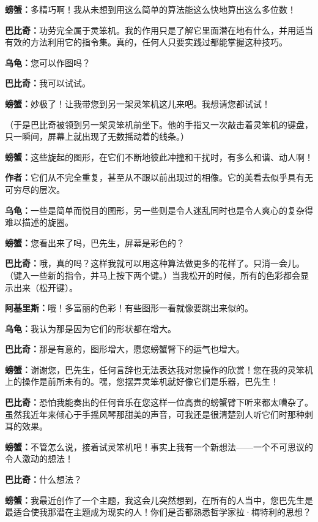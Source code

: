 \documentclass[
  12pt,
  twoside,
  openright,
  oldfontcommands,
]{memoir}
\newcommand{\kaitismall}[1]{{\kaitifamily\small #1}}
\newcommand{\dialogname}[1]{{\heifamily\bfseries #1}}
\begin{document}
\dialogname{螃蟹：}多精巧啊！我从未想到用这么简单的算法能这么快地算出这么多位数！

\dialogname{巴比奇：}功劳完全属于灵笨机。我的作用只是了解它里面潜在地有什么，并用适当有效的方法利用它的指令集。真的，任何人只要实践过都能掌握这种技巧。

\dialogname{乌龟：}您可以作图吗？

\dialogname{巴比奇：}我可以试试。

\dialogname{螃蟹：}妙极了！让我带您到另一架灵笨机这儿来吧。我想请您都试试！

（于是巴比奇被领到另一架灵笨机前坐下。他的手指又一次敲击着灵笨机的键盘，只一瞬间，屏幕上就出现了无数摇动着的线条。）

\dialogname{螃蟹：}这些旋起的图形，在它们不断地彼此冲撞和干扰时，有多么和谐、动人啊！

\dialogname{作者：}它们从不完全重复，甚至从不跟以前出现过的相像。它的美看去似乎具有无可穷尽的层次。

\dialogname{乌龟：}一些是简单而悦目的图形，另一些则是令人迷乱同时也是令人爽心的复杂得难以描述的旋圈。

\dialogname{螃蟹：}您看出来了吗，巴先生，屏幕是彩色的？

\dialogname{巴比奇：}哦，真的吗？这样我就可以用这种算法做更多的花样了。只消一会儿。\kaitismall{（键入一些新的指令，并马上按下两个键。）}当我松开的时候，所有的色彩都会显示出来\kaitismall{（松开键）}。

\dialogname{阿基里斯：}哦！多富丽的色彩！有些图形一看就像要跳出来似的。

\dialogname{乌龟：}我认为那是因为它们的形状都在增大。

\dialogname{巴比奇：}那是有意的，图形增大，愿您螃蟹臂下的运气也增大。

\dialogname{螃蟹：}谢谢您，巴先生，任何言辞也无法表达我对您操作的欣赏！您在我的灵笨机上的操作是前所未有的。嘿，您摆弄灵笨机就好像它们是乐器，巴先生！

\dialogname{巴比奇：}恐怕我能奏出的任何音乐在您这样一位高贵的螃蟹臂下听来都太嘈杂了。虽然我近年来倾心于手摇风琴那甜美的声音，可我还是很清楚别人听它们时那种刺耳的效果。

\dialogname{螃蟹：}不管怎么说，接着试灵笨机吧！事实上我有一个新想法------一个不可思议的令人激动的想法！

\dialogname{巴比奇：}什么想法？

\dialogname{螃蟹：}我最近创作了一个主题，我这会儿突然想到，在所有的人当中，您巴先生是最适合使我那潜在主题成为现实的人！你们是否都熟悉哲学家拉·梅特利的思想？
\end{document}
